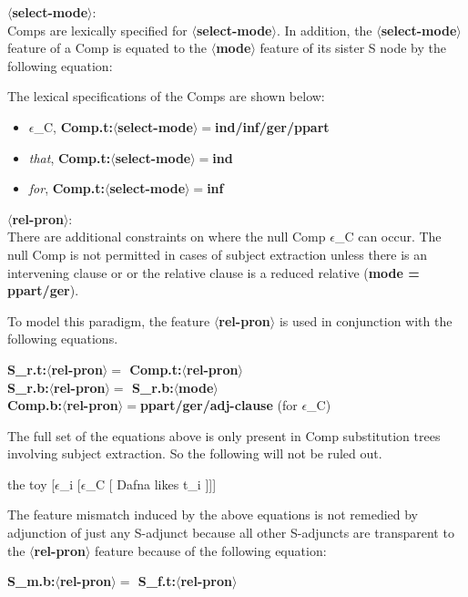 {\bf $\langle$select-mode$\rangle$}:\\
Comps are lexically specified for {\bf $\langle$select-mode$\rangle$}.
In addition, the {\bf $\langle$select-mode$\rangle$} feature of a Comp
is equated to the {\bf $\langle$mode$\rangle$} feature of its
sister S node by the following equation:



The lexical specifications of the Comps are shown below:
\begin{itemize}
\item $\epsilon$_{C}, {\bf Comp.t:$\langle$select-mode$\rangle
=$ind/inf/ger/ppart}
\item {\em that}, {\bf Comp.t:$\langle$select-mode$\rangle =$ind}
\item {\em for}, {\bf Comp.t:$\langle$select-mode$\rangle =$inf}
\end{itemize}

{\bf $\langle$rel-pron$\rangle$}:\\
There are additional constraints on where the null Comp $\epsilon$_{C}
can occur. The null Comp is not permitted in cases of subject
extraction unless there is an intervening clause or or
the relative clause is a reduced relative ({\bf mode = ppart/ger}).

To model this paradigm, the feature {\bf $\langle$rel-pron$\rangle$} is used in
conjunction with the following equations.


\ex
{\bf S_{r}.t:$\langle$rel-pron$\rangle =$ Comp.t:$\langle$rel-pron$\rangle$}\\
\ex
{\bf S_{r}.b:$\langle$rel-pron$\rangle =$ S_{r}.b:$\langle$mode$\rangle$}\\
\ex
{\bf Comp.b:$\langle$rel-pron$\rangle =$ppart/ger/adj-clause}
(for $\epsilon$_{C})

The full set of the equations above is only present in Comp
substitution trees involving subject extraction. So the following will
not be ruled out.

\ex
the toy [$\epsilon$_{i} [$\epsilon$_{C} [ Dafna likes t_i ]]]


The feature mismatch induced by the above equations
is not remedied by adjunction of just any S-adjunct
because all other S-adjuncts
are transparent to the {\bf $\langle$rel-pron$\rangle$} feature
because of the following equation:

\ex
{\bf S_{m}.b:$\langle$rel-pron$\rangle =$ S_{f}.t:$\langle$rel-pron$\rangle$}


